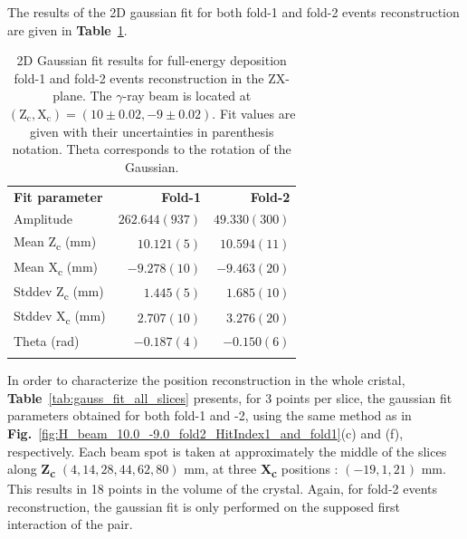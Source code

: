 The results of the 2D gaussian fit for both fold-1 and fold-2 events reconstruction are given in \textbf{Table}~\ref{tab:gaussian_fit_results_combined}.

\begin{table}[ht]
\centering
\caption{2D Gaussian fit results for full-energy deposition fold-1 and fold-2 events reconstruction in the ZX-plane. The $\gamma$-ray beam is located at $(\text{Z}_\text{c}, \text{X}_\text{c}) = (10\pm0.02, -9\pm0.02)$. Fit values are given with their uncertainties in parenthesis notation. Theta corresponds to the rotation of the Gaussian.}
\label{tab:gaussian_fit_results_combined}
\begin{tabular}{lrr}
\hline\noalign{\smallskip}
\textbf{Fit parameter} & \textbf{Fold-1} & \textbf{Fold-2} \\
\noalign{\smallskip}\hline\noalign{\smallskip}
Amplitude & $262.644(937)$ & $49.330(300)$ \\
Mean Z\textsubscript{c} (mm) & $10.121(5)$ & $10.594(11)$ \\
Mean X\textsubscript{c} (mm) & $-9.278(10)$ & $-9.463(20)$ \\
Stddev Z\textsubscript{c} (mm) & $1.445(5)$ & $1.685(10)$ \\
Stddev X\textsubscript{c} (mm) & $2.707(10)$ & $3.276(20)$ \\
Theta (rad) & $-0.187(4)$ & $-0.150(6)$ \\
\noalign{\smallskip}\hline
\end{tabular}
\end{table}

In order to characterize the position reconstruction in the whole cristal, \textbf{Table}~\ref{tab:gauss_fit_all_slices} presents, for 3 points per slice, the gaussian fit parameters obtained for both fold-1 and -2, using the same method as in \textbf{Fig.}~\ref{fig:H_beam_10.0_-9.0_fold2_HitIndex1_and_fold1}(c) and (f), respectively. Each beam spot is taken at approximately the middle of the slices along \textbf{Z\textsubscript{c}} $(4, 14, 28, 44, 62, 80)$ mm, at three \textbf{X\textsubscript{c}} positions : $(-19, 1, 21)$ mm. This results in 18 points in the volume of the crystal. Again, for fold-2 events reconstruction, the gaussian fit is only performed on the supposed first interaction of the pair.


